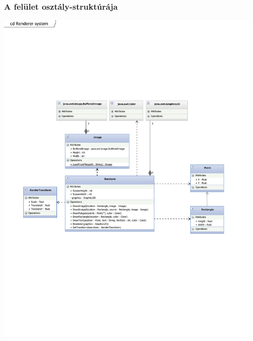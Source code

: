 \subsubsection{A felület osztály-struktúrája}

\graphicspath{{PdfImages/}}
\begin{center}
\includegraphics[scale=0.7]{Renderer.pdf}
\newpage

\end{center}
